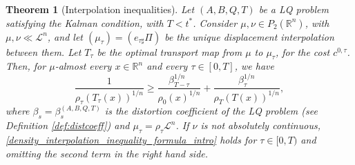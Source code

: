 \documentclass[reqno]{amsart}
\theoremstyle{plain}
\newtheorem{thm}{Theorem}[section]
\theoremstyle{definition}
\theoremstyle{remark}
\newtheorem{rem}[thm]{Remark}
\begin{document}
	\begin{thm}[Interpolation inequalities]\label{5}
		Let $(A,B,Q,T)$ be a LQ problem satisfying the Kalman condition, with $T<t^*$. Consider $\mu,\nu\in P_2(\mathbb{R}^n)$, with $\mu, \nu \ll\mathscr{L}^n$, and let $(\mu_\tau)=(e_{\tau\sharp}\Pi)$ be the unique displacement interpolation between them. Let $T_\tau$ be the optimal transport map from $\mu$ to $\mu_\tau$, for the cost $c^{0,\tau}$. Then, for $\mu$-almost every $x\in\mathbb{R}^n$ and every $\tau\in[0,T]$, we have
			\begin{equation}\label{density_interpolation_inequality_formula_intro}
				\frac{1}{\rho_\tau(T_\tau(x))^{1/n}}\geq\frac{\beta_{T-\tau}^{1/n}}{\rho_0(x)^{1/n}} +\frac{\beta_{\tau}^{1/n}}{\rho_T(T(x))^{1/n}},
			\end{equation}
			where $\beta_s=\beta_s^{(A,B,Q,T)}$ is the distortion coefficient of the LQ problem (see Definition \ref{def:distcoeff}) and $\mu_\tau=\rho_\tau\mathscr{L}^n$. If $\nu$ is not absolutely continuous, \eqref{density_interpolation_inequality_formula_intro} holds for $\tau\in[0,T)$ and omitting the second term in the right hand side.
	\end{thm}
    
\end{document}
